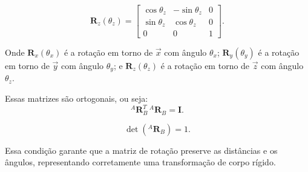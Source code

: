 \begin{equation}
    \label{eq:rotacao_Z}
\mathbf{R}_z(\theta_z) = 
\begin{bmatrix}
\cos\theta_z & -\sin\theta_z & 0 \\
\sin\theta_z &  \cos\theta_z & 0 \\
0            &  0            & 1
\end{bmatrix}.
\end{equation}

Onde $\mathbf{R}_x(\theta_x)$ é a rotação em torno de $\vec{x}$ com ângulo $\theta_x$; $\mathbf{R}_y(\theta_y)$ é a rotação em torno de $\vec{y}$ com ângulo $\theta_y$; e $\mathbf{R}_z(\theta_z)$ é a rotação em torno de $\vec{z}$ com ângulo $\theta_z$.

Essas matrizes são ortogonais, ou seja:
\begin{equation}
\label{eq:Ortogonal_matrizRotacao}
{}^A \mathbf{R}_B^{T}\,{}^A \mathbf{R}_B = \mathbf{I}.
\end{equation}

\begin{equation}
\det\!\left({}^A \mathbf{R}_B\right) = 1.
\end{equation}

Essa condição garante que a matriz de rotação preserve as distâncias e os ângulos, representando corretamente uma transformação de corpo rígido. 




